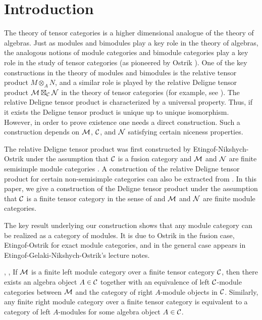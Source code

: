 \documentclass{amsart}
\begin{document}
\tikzexternaldisable

\setcounter{tocdepth}{2}
\tableofcontents



\section{Introduction}

The theory of tensor categories is a higher dimensional analogue of the theory of algebras.  Just as modules and bimodules play a key role in the theory of algebras, the analogous notions of module categories and bimodule categories play a key role in the study of tensor categories (as pioneered by Ostrik \cite{MR1976459}).  One of the key constructions in the theory of modules and bimodules is the relative tensor product $M \otimes_A N$, and a similar role is played by the relative Deligne tensor product $\mathcal M \boxtimes_\mathcal C \mathcal N$ in the theory of tensor categories (for example, see \cite{MR1966524, 0909.3140, MR2909758, 1202.4396}).  The relative Deligne tensor product is characterized by a universal property.  Thus, if it exists the Deligne tensor product is unique up to unique isomorphism.  However, in order to prove existence one needs a direct construction.  Such a construction depends on $\mathcal M$, $\mathcal C$, and $\mathcal N$ satisfying certain niceness properties.  

The relative Deligne tensor product was first constructed by Etingof-Nikshych-Ostrik under the assumption that $\mathcal C$ is a fusion category and $\mathcal M$ and $\mathcal N$ are finite semisimple module categories \cite{0909.3140}.  A construction of the relative Deligne tensor product for certain non-semisimple categories can also be extracted from \cite[Thm 3.1]{1102.3411}.   In this paper, we give a construction of the Deligne tensor product under the assumption that $\mathcal C$ is a finite tensor category in the sense of \cite{MR2119143} and $\mathcal M$ and $\mathcal N$ are finite module categories.  

The key result underlying our construction shows that any module category can be realized as a category of modules.  It is due to Ostrik in the fusion case, Etingof-Ostrik for exact module categories, and in the general case appears in Etingof-Gelaki-Nikshych-Ostrik's lecture notes.


\begin{theorem}{\cite[Thm 2.11.6]{EGNO}, \cite[\S 3.2]{MR2119143}, \cite[Thm 1]{MR1976459}} \label{thm:EGNO2.11.6}
	If $\mathcal M$ is a finite left module category over a finite tensor category $\mathcal C$, then there exists an algebra object $A \in \mathcal C$ together with an equivalence of left $\mathcal C$-module categories between $\mathcal M$ and the category of right $A$-module objects in $\mathcal C$.  Similarly, any finite right module category over a finite tensor category is equivalent to a category of left $A$-modules for some algebra object $A \in \mathcal C$.
\end{theorem}
\end{document}
